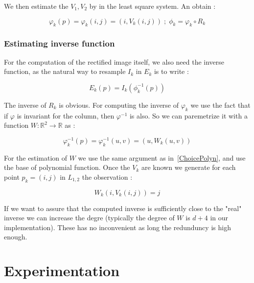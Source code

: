 \documentclass[a4paper]{article}
\newcommand{\RR}{\ensuremath{\mathbb{R}}}
\begin{document}
We then estimate the $V_1,V_2$ by in the least square system. An obtain :

\begin{equation}
  \varphi_k(p) = \varphi_k(i,j) = (i,V_k(i,j))  \;;\;    \phi_k =  \varphi_k  \circ R_k 
\end{equation}

\subsubsection{Estimating inverse function}

For the computation of the rectified image itself, we also need the inverse function, 
as the natural way to resample  $I_k$ in $E_k$ is to write :

\begin{equation}
  E_k(p) = I_k(\phi^{-1}_k(p))
\end{equation}

The inverse of $R_k$ is obvious. For computing the inverse of $\varphi_k$  we
use the fact that if $\varphi$ is invariant for the column, then $\varphi^{-1}$ is also.
So we can paremetrize it with a function $W : \RR^2 \rightarrow \RR$ as :

\begin{equation}
  \varphi^{-1}_k(p) = \varphi^{-1}_k(u,v) = (u,W_k(u,v))  
\end{equation}


For the estimation of $W$ we use the same argument as in~\ref{ChoicePolyn}, and
use the base of polynomial function. Once the $V_k$ are known we generate
for each point $p_k=(i,j)$ in $L_{1,2}$ the observation :

\begin{equation}
   W_k(i,V_k(i,j))  = j \label{InverseEpip}
\end{equation}

If we want to assure that the computed inverse is sufficiently close
to the "real" inverse we can increase the degre (typically the degree of $W$
is $d+4$ in our implementation). These has no inconvenient as long the redunduncy
is high enough.



\section{Experimentation}
\end{document}
